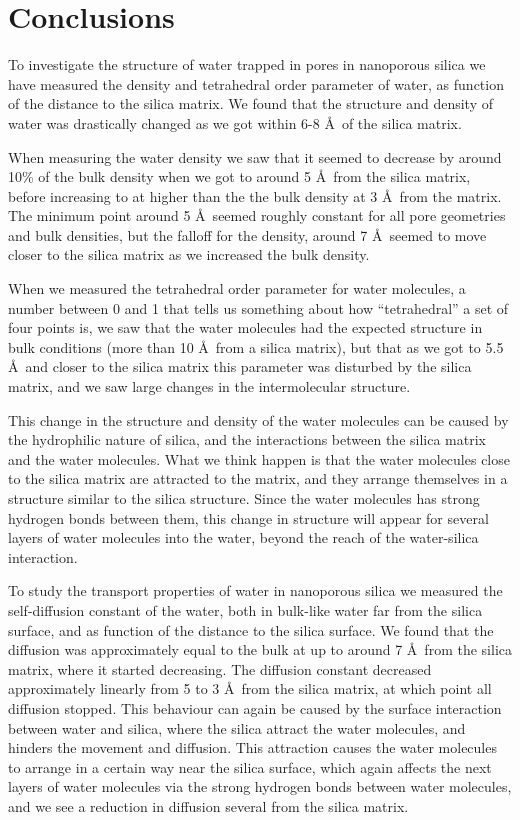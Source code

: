 \section{Conclusions}
To investigate the structure of water trapped in pores in nanoporous silica we have measured the density and tetrahedral order parameter of water, as function of the distance to the silica matrix. We found that the structure and density of water was drastically changed as we got within 6-8 \AA\ of the silica matrix.

When measuring the water density we saw that it seemed to decrease by around 10\% of the bulk density when we got to around 5 \AA\ from the silica matrix, before increasing to at higher than the the bulk density at 3 \AA\ from the matrix. The minimum point around 5 \AA\ seemed roughly constant for all pore geometries and bulk densities, but the falloff for the density, around 7 \AA\ seemed to move closer to the silica matrix as we increased the bulk density.

When we measured the tetrahedral order parameter for water molecules, a number between 0 and 1 that tells us something about how ``tetrahedral'' a set of four points is, we saw that the water molecules had the expected structure in bulk conditions (more than 10 \AA\ from a silica matrix), but that as we got to 5.5 \AA\ and closer to the silica matrix this parameter was disturbed by the silica matrix, and we saw large changes in the intermolecular structure.

This change in the structure and density of the water molecules can be caused by the hydrophilic nature of silica, and the interactions between the silica matrix and the water molecules. What we think happen is that the water molecules close to the silica matrix are attracted to the matrix, and they arrange themselves in a structure similar to the silica structure. Since the water molecules has strong hydrogen bonds between them, this change in structure will appear for several layers of water molecules into the water, beyond the reach of the water-silica interaction.

To study the transport properties of water in nanoporous silica we measured the self-diffusion constant of the water, both in bulk-like water far from the silica surface, and as function of the distance to the silica surface. We found that the diffusion was approximately equal to the bulk at up to around 7 \AA\ from the silica matrix, where it started decreasing. The diffusion constant decreased approximately linearly from 5 to 3 \AA\ from the silica matrix, at which point all diffusion stopped. This behaviour can again be caused by the surface interaction between water and silica, where the silica attract the water molecules, and hinders the movement and diffusion. This attraction causes the water molecules to arrange in a certain way near the silica surface, which again affects the next layers of water molecules via the strong hydrogen bonds between water molecules, and we see a reduction in diffusion several \Ang from the silica matrix.

